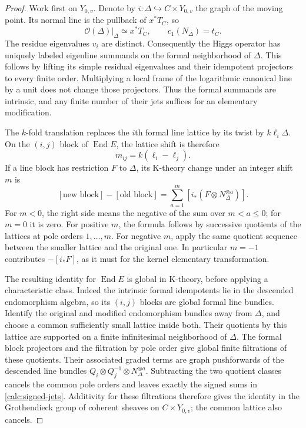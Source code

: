 \begin{proof}
Work first on $Y_{0,v}$.  Denote by $i:\Delta\hookrightarrow C\times Y_{0,v}$
the graph of the moving point.  Its normal line is the pullback of $x^*T_C$,
so
\[
 \mathcal O(\Delta)|_\Delta\simeq x^*T_C,
 \qquad c_1(N_\Delta)=t_C.
\]
The residue eigenvalues $v_i$ are distinct.  Consequently the Higgs operator
has uniquely labeled eigenline summands on the formal neighborhood of
$\Delta$.  This follows by lifting its simple residual eigenvalues and
their idempotent projectors to every finite order.  Multiplying a local
frame of the logarithmic canonical line by a unit does not change those
projectors.  Thus the formal summands are intrinsic, and any finite number
of their jets suffices for an elementary modification.

The $k$-fold translation replaces the $i$th formal line lattice by its twist
by $k\ell_i\Delta$.  On the $(i,j)$ block of $\operatorname{End}E$, the
lattice shift is therefore
\[
 m_{ij}=k(\ell_i-\ell_j).
\]
If a line block has restriction $F$ to $\Delta$, its K-theory change under
an integer shift $m$ is
\begin{equation}\label{calc:signed-jets}
 [\text{new block}]-[\text{old block}]
   =\sum_{a=1}^{m}[i_*(F\otimes N_\Delta^{\otimes a})].
\end{equation}
For $m<0$, the right side means the negative of the sum over $m<a\le0$;
for $m=0$ it is zero.  For positive $m$, the formula follows by successive
quotients of the lattices at pole orders $1,\ldots,m$.  For negative $m$,
apply the same quotient sequence between the smaller lattice and the
original one.  In particular $m=-1$ contributes $-[i_*F]$, as it must for
the kernel elementary transformation.

The resulting identity for $\operatorname{End}E$ is global in K-theory,
before applying a characteristic class.  Indeed the intrinsic formal
idempotents lie in the descended endomorphism algebra, so its $(i,j)$
blocks are global formal line bundles.  Identify the original and modified
endomorphism bundles away from $\Delta$, and choose a common sufficiently
small lattice inside both.  Their quotients by this lattice are supported
on a finite infinitesimal neighborhood of $\Delta$.  The formal block
projectors and the filtration by pole order give global finite
filtrations of these quotients.  Their associated graded terms are
graph pushforwards of the descended line bundles
$Q_i\otimes Q_j^{-1}\otimes N_\Delta^{\otimes a}$.  Subtracting the two
quotient classes cancels the common pole orders and leaves exactly the
signed sums in \eqref{calc:signed-jets}.  Additivity for these filtrations
therefore gives the identity in the Grothendieck group of coherent sheaves
on $C\times Y_{0,v}$; the common lattice also cancels.


\end{proof}
